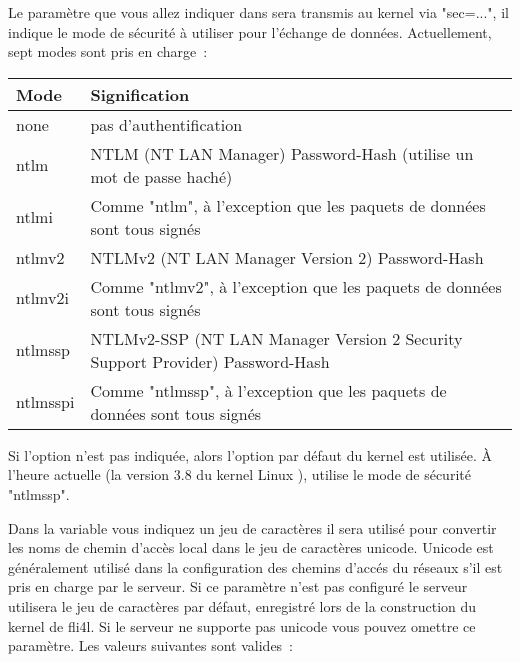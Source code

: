 \begin{description}
  Le paramètre que vous allez indiquer dans  sera transmis
  au kernel via "sec=...", il indique le mode de sécurité à utiliser pour l'échange de
  données. Actuellement, sept modes sont pris en charge~:

    \begin{tabular}{|p{1.5cm}|p{11.5cm}|}
    \hline
    Mode & Signification \\
    \hline
    none & pas d'authentification \\
    ntlm & NTLM (NT LAN Manager) Password-Hash (utilise un mot de passe haché)\\
    ntlmi & Comme "ntlm", à l'exception que les paquets de données sont tous signés \\
    ntlmv2 & NTLMv2 (NT LAN Manager Version 2) Password-Hash \\
    ntlmv2i & Comme "ntlmv2", à l'exception que les paquets de données sont tous signés \\
    ntlmssp & NTLMv2-SSP (NT LAN Manager Version 2 Security Support Provider) Password-Hash \\
    ntlmsspi & Comme "ntlmssp", à l'exception que les paquets de données sont tous signés \\
    \hline
  \end{tabular}

  Si l'option n'est pas indiquée, alors l'option par défaut du kernel est utilisée. À
  l'heure actuelle (la version 3.8 du kernel Linux ), utilise le mode de sécurité "ntlmssp".

  Dans la variable  vous indiquez un jeu de caractères
  il sera utilisé pour convertir les noms de chemin d'accès local dans le jeu de
  caractères unicode. Unicode est généralement utilisé dans la configuration des
  chemins d'accés du réseaux s'il est pris en charge par le serveur. Si ce paramètre
  n'est pas configuré le serveur utilisera le jeu de caractères par défaut, enregistré
  lors de la construction du kernel de fli4l. Si le serveur ne supporte pas unicode vous
  pouvez omettre ce paramètre. Les valeurs suivantes sont valides~:


\end{description}
